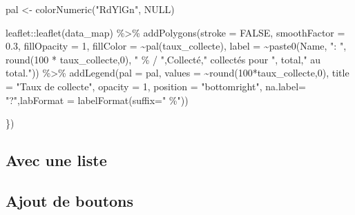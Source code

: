 \documentclass[
  letterpaper,
  DIV=11,
  numbers=noendperiod]{scrreprt}
\newenvironment{Shaded}{\begin{snugshade}}{\end{snugshade}}
\newcommand{\AttributeTok}[1]{\textcolor[rgb]{0.40,0.45,0.13}{#1}}
\newcommand{\ConstantTok}[1]{\textcolor[rgb]{0.56,0.35,0.01}{#1}}
\newcommand{\DecValTok}[1]{\textcolor[rgb]{0.68,0.00,0.00}{#1}}
\newcommand{\FloatTok}[1]{\textcolor[rgb]{0.68,0.00,0.00}{#1}}
\newcommand{\FunctionTok}[1]{\textcolor[rgb]{0.28,0.35,0.67}{#1}}
\newcommand{\NormalTok}[1]{\textcolor[rgb]{0.00,0.23,0.31}{#1}}
\newcommand{\OtherTok}[1]{\textcolor[rgb]{0.00,0.23,0.31}{#1}}
\newcommand{\SpecialCharTok}[1]{\textcolor[rgb]{0.37,0.37,0.37}{#1}}
\newcommand{\StringTok}[1]{\textcolor[rgb]{0.13,0.47,0.30}{#1}}
\begin{document}
\begin{Shaded}
\begin{Highlighting}[]
\NormalTok{        pal }\OtherTok{\textless{}{-}} \FunctionTok{colorNumeric}\NormalTok{(}\StringTok{"RdYlGn"}\NormalTok{, }\ConstantTok{NULL}\NormalTok{)}

\NormalTok{        leaflet}\SpecialCharTok{::}\FunctionTok{leaflet}\NormalTok{(data\_map) }\SpecialCharTok{\%\textgreater{}\%}
          \FunctionTok{addPolygons}\NormalTok{(}\AttributeTok{stroke =} \ConstantTok{FALSE}\NormalTok{, }
              \AttributeTok{smoothFactor =} \FloatTok{0.3}\NormalTok{, }
              \AttributeTok{fillOpacity =} \DecValTok{1}\NormalTok{,}
              \AttributeTok{fillColor =} \SpecialCharTok{\textasciitilde{}}\FunctionTok{pal}\NormalTok{(taux\_collecte),}
              \AttributeTok{label =} \SpecialCharTok{\textasciitilde{}}\FunctionTok{paste0}\NormalTok{(Name, }\StringTok{": "}\NormalTok{,}
                              \FunctionTok{round}\NormalTok{(}\DecValTok{100} \SpecialCharTok{*}\NormalTok{ taux\_collecte,}\DecValTok{0}\NormalTok{),}
                              \StringTok{" \% / "}\NormalTok{,Collecté,}\StringTok{" collectés pour "}\NormalTok{, total,}\StringTok{" au total."}\NormalTok{)) }\SpecialCharTok{\%\textgreater{}\%}
              \FunctionTok{addLegend}\NormalTok{(}\AttributeTok{pal =}\NormalTok{ pal, }\AttributeTok{values =} \SpecialCharTok{\textasciitilde{}}\FunctionTok{round}\NormalTok{(}\DecValTok{100}\SpecialCharTok{*}\NormalTok{taux\_collecte,}\DecValTok{0}\NormalTok{), }\AttributeTok{title =} \StringTok{"Taux de collecte"}\NormalTok{,}
                    \AttributeTok{opacity =} \DecValTok{1}\NormalTok{, }\AttributeTok{position =} \StringTok{"bottomright"}\NormalTok{, }\AttributeTok{na.label=} \StringTok{"?"}\NormalTok{,}\AttributeTok{labFormat =} \FunctionTok{labelFormat}\NormalTok{(}\AttributeTok{suffix=}\StringTok{" \%"}\NormalTok{))}

\NormalTok{    \})}
\end{Highlighting}
\end{Shaded}

\hypertarget{avec-une-liste}{%
\subsection{Avec une liste}\label{avec-une-liste}}

\hypertarget{ajout-de-boutons}{%
\subsection{Ajout de boutons}\label{ajout-de-boutons}}
\end{document}
